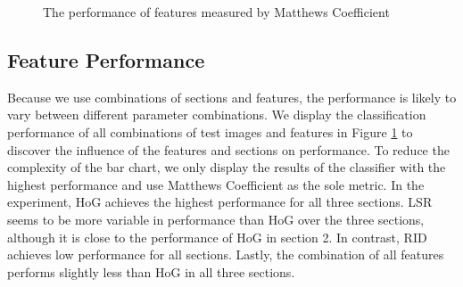 \datazero

\begin{figure}[]
	\caption{The performance of features measured by Matthews Coefficient}
	\label{fig:res_bar_0}
\end{figure}

\subsection{Feature Performance}

Because we use combinations of sections and features, the performance is likely to vary between different parameter combinations. We display the classification performance of all combinations of test images and features in Figure \ref{fig:res_bar_0} to discover the influence of the features and sections on performance. To reduce the complexity of the bar chart, we only display the results of the classifier with the highest performance and use Matthews Coefficient as the sole metric. In the experiment, HoG achieves the highest performance for all three sections. LSR seems to be more variable in performance than HoG over the three sections, although it is close to the performance of HoG in section 2. In contrast, RID achieves low performance for all sections. Lastly, the combination of all features performs slightly less than HoG in all three sections.


\dataone

